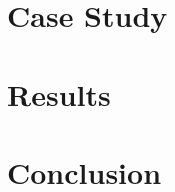 \documentclass{beamer}
\begin{document}
\section{Case Study}




\section{Results}




\section{Conclusion}
\end{document}
